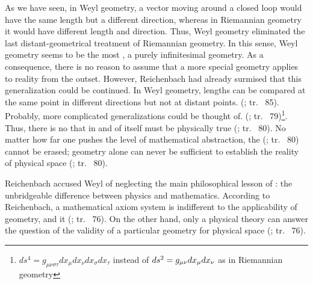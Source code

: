 \documentclass[final]{article}
\newcommand{\WG}{Weyl geometry\xspace}
\newcommand{\rhp}[2]{(\cite[#1]{Reichenbach1920a}; tr.\ \citeyear{Reichenbach1969} #2)\xspace}
\begin{document}
As we have seen, in \WG, a vector moving around a closed loop would have the same length but a different direction, whereas in Riemannian geometry it would have different length and direction. Thus, \WG eliminated the last distant-geometrical treatment of Riemannian geometry. In this sense, \WG seems to be the most , a purely infinitesimal geometry. As a consequence, there is no reason to assume that a more special geometry applies to reality from the outset. However, Reichenbach had already surmised that this generalization could be continued. In \WG, lengths can be compared at the same point in different directions but not at distant points.  \rhp{76}{85}. Probably, more complicated generalizations could be thought of.  \rhp{76}{79}\footnote{$d s^{4}=g_{\mu \nu \sigma \tau} d x_{\mu} d x_{\nu} d x_{\sigma} d x_{\tau}$ instead of $d s^{2}=g_{\mu\nu} d x_{\mu} d x_{\nu}$ as in Riemannian geometry}. Thus, there is no  that in and of itself must be physically true \rhp{76}{80}. No matter how far one pushes the level of mathematical abstraction, the  \rhp{76}{80} cannot be erased; geometry alone can never be sufficient to establish the reality of physical space \rhp{76}{80}.

Reichenbach accused Weyl of neglecting the main philosophical lesson of \gr: the unbridgeable difference between physics and mathematics. According to Reichenbach, a mathematical axiom system is indifferent to the applicability of geometry, and it  \rhp{73}{76}. On the other hand, only a physical theory can answer the question of the validity of a particular geometry for physical space \rhp{73}{76}.
\end{document}
